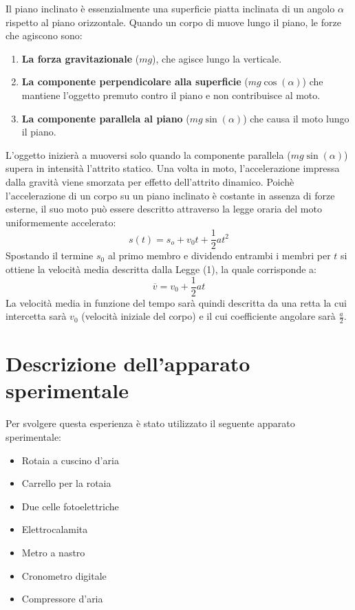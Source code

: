 \documentclass[11pt]{article}
\begin{document}
Il piano inclinato è essenzialmente una superficie piatta inclinata di un angolo $\alpha$ rispetto al piano orizzontale. Quando un corpo di muove lungo il piano, le forze che agiscono sono:
\begin{enumerate}
    \item \textbf{La forza gravitazionale} ($mg$), che agisce lungo la verticale.
    \item \textbf{La componente perpendicolare alla superficie} ($mg\cos(\alpha)$) che mantiene l'oggetto premuto contro il piano e non contribuisce al moto.
    \item \textbf{La componente parallela al piano} ($mg\sin(\alpha)$) che causa il moto lungo il piano.
\end{enumerate}
L'oggetto inizierà a muoversi solo quando la componente parallela ($mg\sin(\alpha)$) supera in intensità l'attrito statico. Una volta in moto, l'accelerazione impressa dalla gravità viene smorzata per effetto dell'attrito dinamico. Poichè l'accelerazione di un corpo su un piano inclinato è costante in assenza di forze esterne, il suo moto può essere descritto attraverso la legge oraria del moto uniformemente accelerato:
\begin{equation}
    s(t)=s_o+v_0t+\frac{1}{2}at^2
\end{equation}
Spostando il termine $s_0$ al primo membro e dividendo entrambi i membri per $t$ si ottiene la velocità media descritta dalla Legge (1), la quale corrisponde a:
\begin{equation}
    \overline{v}=v_0+\frac{1}{2}at
\end{equation}
La velocità media in funzione del tempo sarà quindi descritta da una retta la cui intercetta sarà $v_0$ (velocità iniziale del corpo) e il cui coefficiente angolare sarà $\frac{a}{2}$.

\section{Descrizione dell'apparato sperimentale}

Per svolgere questa esperienza è stato utilizzato il seguente apparato sperimentale:
\begin{itemize}
    \item Rotaia a cuscino d'aria
    \item Carrello per la rotaia
    \item Due celle fotoelettriche
    \item Elettrocalamita
    \item Metro a nastro 
    \item Cronometro digitale
    \item Compressore d'aria
\end{itemize}
\end{document}
